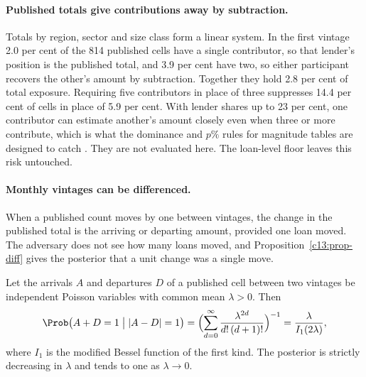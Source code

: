 \paragraph{Published totals give contributions away by subtraction.} Totals by
region, sector and size class form a linear system. In the first vintage 2.0 per cent
of the 814 published cells have a single contributor, so that lender's position is
the published total, and 3.9 per cent have two, so either participant recovers the
other's amount by subtraction. Together they hold 2.8 per cent of total exposure.
Requiring five contributors in place of three suppresses 14.4 per cent of cells in
place of 5.9 per cent.
With lender shares up to 23 per cent, one contributor can estimate another's amount
closely even when three or more contribute, which is what the dominance and $p\%$
rules for magnitude tables are designed to catch \citep[ch.~4]{hundepool2012}. They
are not evaluated here. The loan-level floor leaves this risk untouched.

\paragraph{Monthly vintages can be differenced.} When a published count moves by
one between vintages, the change in the published total is the arriving or departing
amount, provided one loan moved. The adversary does not see how many loans moved,
and Proposition~\ref{c13:prop-diff} gives the posterior that a unit change was a
single move.

\begin{proposition}\label{c13:prop-diff}
Let the arrivals $A$ and departures $D$ of a published cell between two vintages be
independent Poisson variables with common mean $\lambda > 0$. Then
\begin{equation}\label{c13:eq-diff}
\Prob\bigl(A + D = 1 \bigm| |A - D| = 1\bigr)
= \Bigl(\sum_{d=0}^{\infty} \frac{\lambda^{2d}}{d!\,(d+1)!}\Bigr)^{-1}
= \frac{\lambda}{I_1(2\lambda)},
\end{equation}
where $I_1$ is the modified Bessel function of the first kind. The posterior is
strictly decreasing in $\lambda$ and tends to one as $\lambda \to 0$.
\end{proposition}


